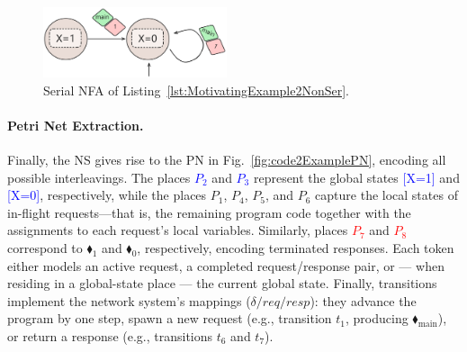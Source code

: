 \begin{figure}  %
	\centering
	\includegraphics[width=0.48\textwidth,trim=0 0 0 0,clip]{plots/code_2_NFA_v3.pdf}
	\caption{Serial NFA of Listing~\ref{lst:MotivatingExample2NonSer}.}
	\label{fig:code2ExampleNFA}
\end{figure}




\paragraph{Petri Net Extraction.}

Finally, the NS gives rise to the PN in Fig.~\ref{fig:code2ExamplePN}, encoding all possible interleavings. The places \textcolor{blue}{ $P_2$} and \textcolor{blue}{$P_3$} represent the global states \textcolor{blue}{[X=1]} and \textcolor{blue}{[X=0]}, respectively, while the places $P_1$, $P_4$, $P_5$, and $P_6$ capture the local states of in-flight requests—that is, the remaining program code together with the assignments to each request’s local variables. Similarly, places \textcolor{red}{$P_7$} and \textcolor{red}{$P_8$} correspond to {\color{red}$\blacklozenge_1$} and {\color{red}$\blacklozenge_0$}, respectively, encoding terminated responses. Each token either models an active request, a completed request/response pair, or --- when residing in a global-state place --- the current global state. Finally, transitions implement the network system’s mappings ($\delta/req/resp$): they advance the program by one step, spawn a new request (e.g., transition $t_1$, producing {\color{ForestGreen}$\blacklozenge_{\mathrm{main}}$}), or return a response (e.g., transitions $t_6$ and $t_7$).


